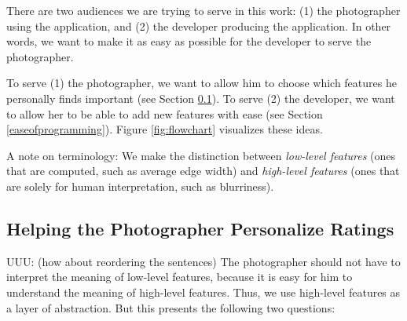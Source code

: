 \documentclass[11pt,letter]{article}
\begin{document}
There are two audiences we are trying to serve in this work: (1) the photographer using the application, and (2) the developer producing the application. In other words, we want to make it as easy as possible for the developer to serve the photographer.

To serve (1) the photographer, we want to allow him to choose which features he personally finds important (see Section \ref{abstraction}). To serve (2) the developer, we want to allow her to be able to add new features with ease (see Section \ref{easeofprogramming}). Figure \ref{fig:flowchart} visualizes these ideas.

A note on terminology: We make the distinction between \textit{low-level features} (ones that are computed, such as average edge width) and \textit{high-level features} (ones that are solely for human interpretation, such as blurriness).

\begin{figure*}[b!]
  \centering
  \caption{An example flowchart. Here, the application computes three low-level features. All three combine to rate the two high-level features: blurriness and exposure. The developer controls which features are present. The photographer decides how to weight each high-level feature. UUU: (photographer's decision/opinion/input effects the default values of the highlevel features)}
  \label{fig:flowchart}
\end{figure*}

\subsection{Helping the Photographer Personalize Ratings}
\label{abstraction}
UUU: (how about reordering the sentences)
The photographer should not have to interpret the meaning of low-level features, because it is easy for him to understand the meaning of high-level features. Thus, we use high-level features as a layer of abstraction.  But this presents the following two questions:
\end{document}

